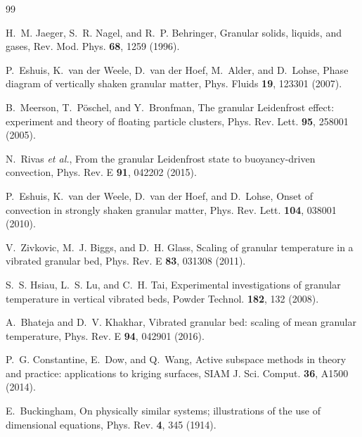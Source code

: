 \documentclass[aps,pre,twocolumn,superscriptaddress,floatfix]{revtex4-2}
\begin{document}
\begin{thebibliography}{99}

 H.~M. Jaeger, S.~R. Nagel, and R.~P. Behringer, Granular solids, liquids, and gases, Rev. Mod. Phys. \textbf{68}, 1259 (1996).

 P.~Eshuis, K.~van der Weele, D.~van der Hoef, M.~Alder, and D.~Lohse, Phase diagram of vertically shaken granular matter, Phys. Fluids \textbf{19}, 123301 (2007).

 B.~Meerson, T.~P\"oschel, and Y.~Bronfman, The granular Leidenfrost effect: experiment and theory of floating particle clusters, Phys. Rev. Lett. \textbf{95}, 258001 (2005).

 N.~Rivas \emph{et al.}, From the granular Leidenfrost state to buoyancy-driven convection, Phys. Rev. E \textbf{91}, 042202 (2015).

 P.~Eshuis, K.~van der Weele, D.~van der Hoef, and D.~Lohse, Onset of convection in strongly shaken granular matter, Phys. Rev. Lett. \textbf{104}, 038001 (2010).

 V.~Zivkovic, M.~J. Biggs, and D.~H. Glass, Scaling of granular temperature in a vibrated granular bed, Phys. Rev. E \textbf{83}, 031308 (2011).

 S.~S. Hsiau, L.~S. Lu, and C.~H. Tai, Experimental investigations of granular temperature in vertical vibrated beds, Powder Technol. \textbf{182}, 132 (2008).

 A.~Bhateja and D.~V. Khakhar, Vibrated granular bed: scaling of mean granular temperature, Phys. Rev. E \textbf{94}, 042901 (2016).

 P.~G. Constantine, E.~Dow, and Q.~Wang, Active subspace methods in theory and practice: applications to kriging surfaces, SIAM J. Sci. Comput. \textbf{36}, A1500 (2014).

 E.~Buckingham, On physically similar systems; illustrations of the use of dimensional equations, Phys. Rev. \textbf{4}, 345 (1914).

\end{thebibliography}
\end{document}
